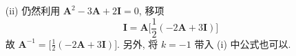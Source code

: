 \documentclass[a4paper, 12pt, UTF8]{ctexart}
\begin{document}
{\begin{solution}
\begin{itemize}
\[\begin{bmatrix}
                  2 & 0 \\ 0 & 1
              \end{bmatrix}
              \begin{bmatrix}
                  2 & 1 \\ 1 & 1
              \end{bmatrix}
          \]
          由 $c_{0} = 0, d_{0}=1$, 得
          \[
              \begin{aligned}
                  \begin{bmatrix}
                      c_{k} \\d_{k}
                  \end{bmatrix} &= \boldsymbol{A}^{k}
                  \begin{bmatrix}
                      c_{0} \\ d_{0}
                  \end{bmatrix} =
                  \boldsymbol{S\Lambda}^{k}\boldsymbol{S}^{-1}
                  \begin{bmatrix}
                      c_{0} \\ d_{0}
                  \end{bmatrix} \\
                  &= \begin{bmatrix} 1 & -1 \\ -1 & 2
                  \end{bmatrix}
                  \begin{bmatrix}
                      2^{k} & 0 \\ 0 & 1^{k}
                  \end{bmatrix}
                  \begin{bmatrix}
                      2 & 1 \\ 1 & 1
                  \end{bmatrix}
                  \begin{bmatrix}
                      0 \\ 1
                  \end{bmatrix}
                  =
                  \begin{bmatrix}
                      2^{k} - 1 \\ -2^{k} + 2
                  \end{bmatrix}
              \end{aligned}
          \]
          \item[(ii)] 仍然利用 $\boldsymbol{A}^{2} - 3\boldsymbol{A} + 2\boldsymbol{I} = 0$, 移项
          \[
              \boldsymbol{I} = \boldsymbol{A}\biggl[ \frac{1}{2}(-2\boldsymbol{A} + 3 \boldsymbol{I}) \biggr]
          \]
          故 $\boldsymbol{A}^{-1} = \biggl[ \frac{1}{2}(-2\boldsymbol{A} + 3 \boldsymbol{I}) \biggr]$. 另外, 将 $k=-1$ 带入 (i) 中公式也可以.
      \end{itemize}
  \end{solution}
}
\end{document}
